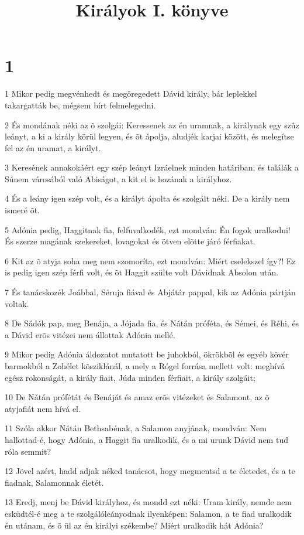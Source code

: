 

\title{Királyok I. könyve}


\chapter{1}

\par 1 Mikor pedig megvénhedt és megöregedett Dávid király, bár leplekkel takargatták be, mégsem bírt felmelegedni.
\par 2 És mondának néki az õ szolgái: Keressenek az én uramnak, a királynak egy szûz leányt, a ki a király körül legyen, és õt ápolja, aludjék karjai között, és melegítse fel az én uramat, a királyt.
\par 3 Keresének annakokáért egy szép leányt Izráelnek minden határiban; és találák a Súnem városából való Abiságot,  a kit el is hozának a királyhoz.
\par 4 És a leány igen szép volt, és a királyt ápolta és szolgált néki. De a király nem ismeré õt.
\par 5 Adónia pedig, Haggitnak fia, felfuvalkodék, ezt mondván: Én fogok uralkodni! És szerze magának szekereket, lovagokat és ötven elõtte járó férfiakat.
\par 6 Kit az õ atyja soha meg nem szomoríta, ezt mondván: Miért cselekszel így?! Ez is pedig igen szép férfi volt, és õt Haggit szülte volt Dávidnak Absolon után.
\par 7 És tanácskozék Joábbal, Séruja fiával és Abjátár pappal, kik az Adónia pártján voltak.
\par 8 De Sádók pap, meg Benája, a Jójada fia, és Nátán  próféta, és Sémei, és Réhi, és a Dávid erõs vitézei nem állottak Adónia mellé.
\par 9 Mikor pedig Adónia áldozatot mutatott be juhokból, ökrökbõl és egyéb kövér barmokból a Zohélet kõsziklánál, a mely a Rógel forrása mellett volt: meghívá egész rokonságát, a király fiait, Júda minden férfiait, a király szolgáit;
\par 10 De Nátán prófétát és Benáját és amaz erõs vitézeket és Salamont, az õ atyjafiát nem hívá el.
\par 11 Szóla akkor Nátán Bethsabénak, a Salamon anyjának, mondván: Nem hallottad-é, hogy Adónia, a Haggit fia uralkodik, és a mi urunk Dávid nem tud róla semmit?
\par 12 Jövel azért, hadd adjak néked tanácsot, hogy megmentsd a te életedet, és a te fiadnak, Salamonnak életét.
\par 13 Eredj, menj be Dávid királyhoz, és mondd ezt néki: Uram király, nemde nem esküdtél-é meg a te szolgálóleányodnak ilyenképen: Salamon, a te fiad uralkodik én utánam, és õ ül az én királyi székembe? Miért uralkodik hát Adónia?

